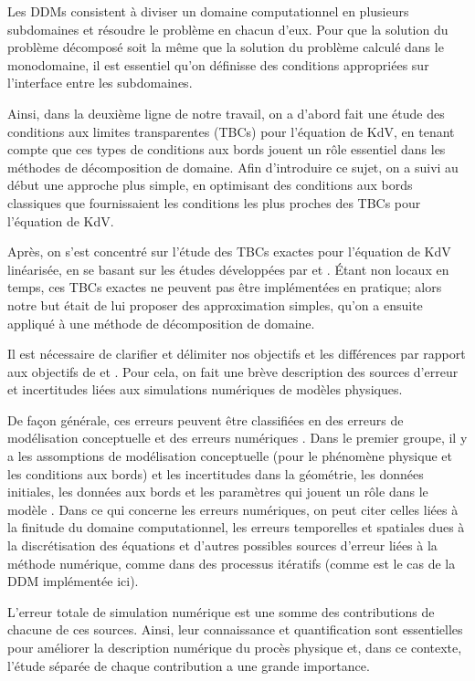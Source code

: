 \indent Les DDMs consistent à diviser un domaine computationnel en plusieurs subdomaines et résoudre le problème en chacun d'eux. Pour que la solution du problème décomposé soit la même que la solution du problème calculé dans le monodomaine, il est essentiel qu'on définisse des conditions appropriées sur l'interface entre les subdomaines.

\indent Ainsi, dans la deuxième ligne de notre travail, on a d'abord fait une étude des conditions aux limites transparentes (TBCs) pour l'équation de KdV, en tenant compte que ces types de conditions aux bords jouent un rôle essentiel dans les méthodes de décomposition de domaine. Afin d'introduire ce sujet, on a suivi au début une approche plus simple, en optimisant des conditions aux bords classiques que fournissaient les conditions les plus proches des TBCs pour l'équation de KdV.

\indent Après, on s'est concentré sur l'étude des TBCs exactes pour l'équation de KdV linéarisée, en se basant sur les études développées par \cite{zheng2008} et \cite{besse2015}. Étant non locaux en temps, ces TBCs exactes ne peuvent pas être implémentées en pratique; alors notre but était de lui proposer des approximation simples, qu'on a ensuite appliqué à une méthode de décomposition de domaine.

\indent Il est nécessaire de clarifier et délimiter nos objectifs et les différences par rapport aux objectifs de \cite{zheng2008} et \cite{besse2015}. Pour cela, on fait une brève description des sources d'erreur et incertitudes liées aux simulations numériques de modèles physiques.

\indent De façon générale, ces erreurs peuvent être classifiées en des erreurs de modélisation conceptuelle et des erreurs numériques \cite{roache1997}. Dans le premier groupe, il y a les assomptions de modélisation conceptuelle (pour le phénomène physique et les conditions aux bords) et les incertitudes dans la géométrie, les données initiales, les données aux bords et les paramètres qui jouent un rôle dans le modèle \cite{roache1997,balagurusamy2008}. Dans ce qui concerne les erreurs numériques, on peut citer celles liées à la finitude du domaine computationnel, les erreurs temporelles et spatiales dues à la discrétisation des équations \cite{karniadakis1995,roache1997} et d'autres possibles sources d'erreur liées à la méthode numérique, comme dans des processus itératifs (comme est le cas de la DDM implémentée ici).

\indent L'erreur totale de simulation numérique est une somme des contributions de chacune de ces sources. Ainsi, leur connaissance et quantification sont essentielles pour améliorer la description numérique du procès physique et, dans ce contexte, l'étude séparée de chaque contribution a une grande importance.

